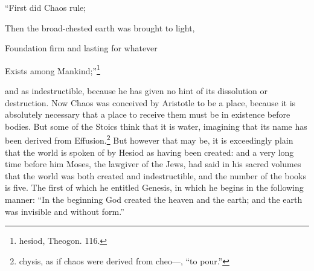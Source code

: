 ``First did Chaos rule;

Then the broad-chested earth was brought to light,

Foundation firm and lasting for whatever

Exists among Mankind;''\footnote{hesiod, Theogon. 116.}

and as indestructible, because he has given no hint of its dissolution or destruction. Now Chaos
was conceived by Aristotle to be a place, because it is absolutely necessary that a place to
receive them must be in existence before bodies. But some of the Stoics think that it is water,
imagining that its name has been derived from Effusion.\footnote{chysis, as if chaos were derived from cheo—, ``to
pour.''} But however that may be, it is exceedingly plain that the world is spoken of by Hesiod as
having been created: and a very long time before him Moses, the lawgiver of the Jews, had said in
his sacred volumes that the world was both created and indestructible, and the number of the
books is five. The first of which he entitled Genesis, in which he begins in the following manner: ``In
the beginning God created the heaven and the earth; and the earth was invisible and without form.''

